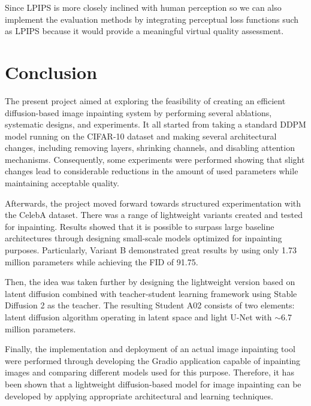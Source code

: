\documentclass[journal]{IEEEtran}
\begin{document}
Since LPIPS is more closely inclined with human perception so we can also implement the evaluation methods by integrating perceptual loss functions such as LPIPS because it would provide a meaningful virtual quality assessment.

\section{Conclusion}
The present project aimed at exploring the feasibility of creating an efficient diffusion-based image inpainting system by performing several ablations, systematic designs, and experiments. It all started from taking a standard DDPM model running on the CIFAR-10 dataset and making several architectural changes, including removing layers, shrinking channels, and disabling attention mechanisms. Consequently, some experiments were performed showing that slight changes lead to considerable reductions in the amount of used parameters while maintaining acceptable quality.

Afterwards, the project moved forward towards structured experimentation with the CelebA dataset. There was a range of lightweight variants created and tested for inpainting. Results showed that it is possible to surpass large baseline architectures through designing small-scale models optimized for inpainting purposes. Particularly, Variant B demonstrated great results by using only 1.73 million parameters while achieving the FID of 91.75.

Then, the idea was taken further by designing the lightweight version based on latent diffusion combined with teacher-student learning framework using Stable Diffusion 2 as the teacher. The resulting Student A02 consists of two elements: latent diffusion algorithm operating in latent space and light U-Net with $\sim$6.7 million parameters.

Finally, the implementation and deployment of an actual image inpainting tool were performed through developing the Gradio application capable of inpainting images and comparing different models used for this purpose. Therefore, it has been shown that a lightweight diffusion-based model for image inpainting can be developed by applying appropriate architectural and learning techniques.

\nocite{biswas2025pixels,buburuzan2025mobi,kim2025rad,yang2023unipaint,wasserman2025paint}
\balance


\end{document}
